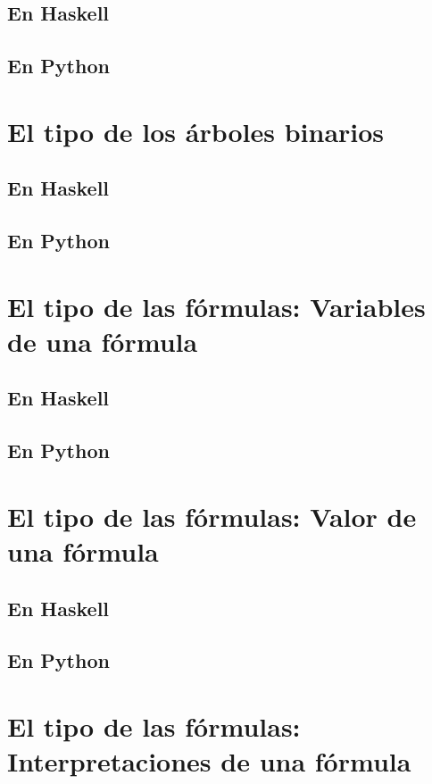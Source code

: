 \documentclass[a4paper,12pt,twoside]{book}
\begin{document}
\subsection*{En Haskell}
\subsection*{En Python}

\section{El tipo de los árboles binarios}
\subsection*{En Haskell}
\subsection*{En Python}

\section{El tipo de las fórmulas: Variables de una fórmula}
\subsection*{En Haskell}
\subsection*{En Python}

\section{El tipo de las fórmulas: Valor de una fórmula}
\subsection*{En Haskell}
\subsection*{En Python}

\section{El tipo de las fórmulas: Interpretaciones de una fórmula}
\end{document}
